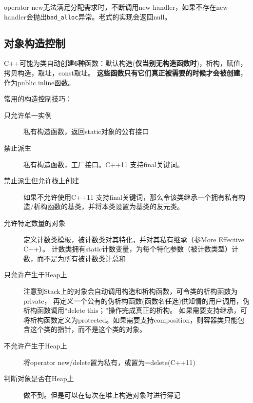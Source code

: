 operator new无法满足分配需求时，不断调用new-handler，如果不存在new-handler会抛出\verb$bad_alloc$异常。老式的实现会返回null。

\subsection{对象构造控制}

C++可能为类自动创建\textbf{6种}函数：默认构造(\textbf{仅当别无构造函数时})，析构，赋值，拷贝构造，取址，const取址。
\textbf{这些函数只有它们真正被需要的时候才会被创建}，作为public inline函数。

常用的构造控制技巧：
\begin{description}
\item[只允许单一实例]私有构造函数，返回static对象的公有接口
\item[禁止派生]私有构造函数，工厂接口。C++11 支持final关键词。
\item[禁止派生但允许栈上创建]如果不允许使用C++11 支持final关键词，那么令该类继承一个拥有私有构造/析构函数的基类，并将本类设置为基类的友元类。
\item[允许特定数量的对象]定义计数类模板，被计数类对其特化，并对其私有继承（参More Effective C++）。
计数类拥有static计数变量，为每个特化参数（被计数类型）计数，而不是为所有被计数类计总和
\item[只允许产生于Heap上]注意到Stack上的对象会自动调用构造和析构函数，可令类的析构函数为private，
再定义一个公有的伪析构函数(函数名任选)供知情的用户调用，伪析构函数调用“delete this；”操作完成真正的析构。
如果需要支持继承，可将析构函数定义为protected。如果需要支持composition，则容器类只能包含这个类的指针，而不是这个类的对象。
\item[不允许产生于Heap上]将operator new/delete置为私有，或置为=delete(C++11)
\item[判断对象是否在Heap上]做不到。但是可以在每次在堆上构造对象时进行簿记
\end{description}


                            


























